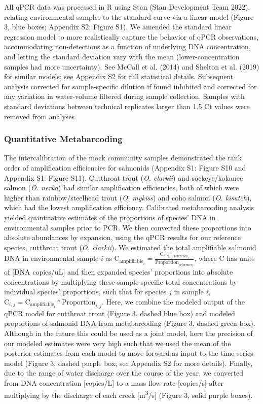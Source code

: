 \documentclass[
]{article}
\begin{document}
All qPCR data was processed in R using Stan (Stan Development Team
2022), relating environmental samples to the standard curve via a linear
model (Figure 3, blue boxes; Appendix S2: Figure S1). We amended the
standard linear regression model to more realistically capture the
behavior of qPCR observations, accommodating non-detections as a
function of underlying DNA concentration, and letting the standard
deviation vary with the mean (lower-concentration samples had more
uncertainty). See McCall et al. (2014) and Shelton et al. (2019) for
similar models; see Appendix S2 for full statistical details. Subsequent
analysis corrected for sample-specific dilution if found inhibited and
corrected for any variation in water-volume filtered during sample
collection. Samples with standard deviations between technical
replicates larger than 1.5 Ct values were removed from analyses.

\hypertarget{quantitative-metabarcoding}{%
\subsubsection{Quantitative
Metabarcoding}\label{quantitative-metabarcoding}}

The intercalibration of the mock community samples demonstrated the rank
order of amplification efficiencies for salmonids (Appendix S1: Figure
S10 and Appendix S1: Figure S11). Cutthroat trout (\emph{O. clarkii})
and sockeye/kokanee salmon (\emph{O. nerka}) had similar amplification
efficiencies, both of which were higher than rainbow/steelhead trout
(\emph{O. mykiss}) and coho salmon (\emph{O. kisutch}), which had the
lowest amplification efficiency. Calibrated metabarcoding analysis
yielded quantitative estimates of the proportions of species' DNA in
environmental samples prior to PCR. We then converted these proportions
into absolute abundances by expansion, using the qPCR results for our
reference species, cutthroat trout (\emph{O. clarkii}). We estimated the
total amplifiable salmonid DNA in environmental sample \(i\) as
\(\text{C}_{\text{amplifiable}_{i}} = \frac{\text{C}_{\text{qPCR reference}_{i}}}{\text{Proportion}_{\text{reference}_{i}}}\),
where C has units of {[}DNA copies/uL{]} and then expanded species'
proportions into absolute concentrations by multiplying these
sample-specific total concentrations by individual species' proportions,
such that for species \(j\) in sample \(i\),
\(\text{C}_{i,j} = \text{C}_{\text{amplifiable}_{i}} * \text{Proportion}_{i,j}\).
Here, we combine the modeled output of the qPCR model for cutthroat
trout (Figure 3, dashed blue box) and modeled proportions of salmonid
DNA from metabarcoding (Figure 3, dashed green box). Although in the
future this could be used as a joint model, here the precision of our
modeled estimates were very high such that we used the mean of the
posterior estimates from each model to move forward as input to the time
series model (Figure 3, dashed purple box; see Appendix S2 for more
details). Finally, due to the range of water discharge over the course
of the year, we converted from DNA concentration {[}copies/L{]} to a
mass flow rate {[}copies/s{]} after multiplying by the discharge of each
creek {[}m\textsuperscript{3}/s{]} (Figure 3, solid purple boxes).
\end{document}
